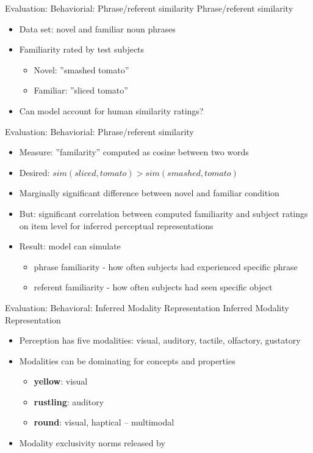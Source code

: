 \documentclass[12pt,a4paper]{beamer}
\begin{document}
\begin{frame}{Evaluation: Behaviorial: Phrase/referent similarity}
Phrase/referent similarity
\begin{itemize}
\item Data set: novel and familiar noun phrases 
\item Familiarity rated by test subjects
    \begin{itemize}
    \item Novel: ''smashed tomato''
    \item Familiar: ''sliced tomato''
    \end{itemize}
\item Can model account for human similarity ratings?
\end{itemize}
\end{frame}

\begin{frame}{Evaluation: Behaviorial: Phrase/referent similarity}
\begin{itemize}
\item Measure: ''familarity'' computed as cosine between two words
\item Desired: $sim(sliced,tomato) > sim(smashed,tomato)$
\item Marginally significant difference between novel and familiar condition
\item But: significant correlation between computed familiarity and subject ratings on item level for inferred perceptual representations
\item Result: model can simulate
    \begin{itemize}
    \item phrase familiarity - how often subjects had experienced specific phrase
    \item referent familiarity - how often subjects had seen specific object
    \end{itemize}
\end{itemize}
\end{frame}

\begin{frame}{Evaluation: Behavioral: Inferred Modality Representation}
Inferred Modality Representation
\begin{itemize}
\item Perception has five modalities: visual, auditory, tactile, olfactory, gustatory
\item Modalities can be dominating for concepts and properties
\begin{itemize}
    \item \textbf{yellow}: visual
    \item \textbf{rustling}: auditory
    \item \textbf{round}: visual, haptical -- multimodal
\end{itemize}
\item Modality exclusivity norms released by \cite{lynott} 
\end{itemize}
\end{frame}
\end{document}

